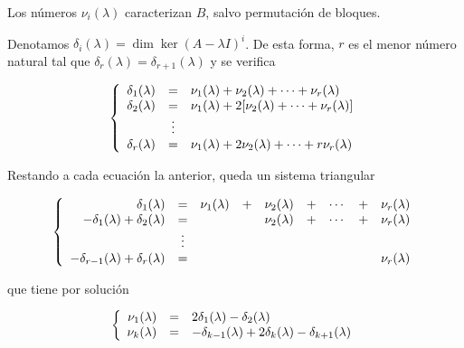 \documentclass[../ecuaciones_diferenciales.tex]{subfiles}
\begin{document}
\begin{remark}
	Los números \(\nu_i(\lambda)\) caracterizan \(B\), salvo permutación de bloques.
\end{remark}

Denotamos \(\delta_i(\lambda) = \dim \ker (A - \lambda I)^i\). De esta forma,
\(r\) es el menor número natural tal que \(\delta_r(\lambda) =
\delta_{r+1}(\lambda)\) y se verifica

\[\left\{
	\begin{array}[ht]{r c l}
		\delta_1(\lambda) & =      & \nu_1(\lambda) + \nu_2(\lambda) + \cdots +
		\nu_r(\lambda)                                                                           \\
		\delta_2(\lambda) & =      & \nu_1(\lambda) + 2[\nu_2(\lambda) + \cdots +
		\nu_r(\lambda)]                                                                          \\
		                  & \vdots &                                                             \\
		\delta_r(\lambda) & =      & \nu_1(\lambda) + 2\nu_2(\lambda) + \cdots + r\nu_r(\lambda)
	\end{array}
	\right.
\]

Restando a cada ecuación la anterior, queda un sistema triangular

\[\left\{
	\begin{array}[ht]{r c c c c c c c c}
		\delta_1(\lambda)                          & =      & \nu_1(\lambda) & + & \nu_2(\lambda) & + & \cdots & + & \nu_r(\lambda) \\
		-\delta_1(\lambda) + \delta_2(\lambda)     & =      &                &   & \nu_2(\lambda) & + & \cdots & + & \nu_r(\lambda) \\
		                                           & \vdots &                                                                       \\
		-\delta_{r-1}(\lambda) + \delta_r(\lambda) & =      &                &   &                &   &        &   & \nu_r(\lambda)
	\end{array}
	\right.
\]

que tiene por solución

\[\left\{
	\begin{array}[ht]{r c l}
		\nu_1(\lambda) & = & 2\delta_1(\lambda) - \delta_2(\lambda)                              \\
		\nu_k(\lambda) & = & -\delta_{k-1}(\lambda) + 2\delta_k(\lambda) - \delta_{k+1}(\lambda)
	\end{array}
	\right.
\]
\end{document}
